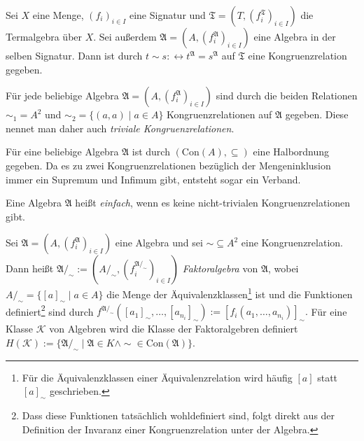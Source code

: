 \begin{example}
    Sei $X$ eine Menge, $(f_i)_{i\in I}$ eine Signatur und $\mathfrak{T}=(T,(f^\mathfrak{T}_i)_{i\in I})$ die Termalgebra über $X$.
    Sei außerdem $\mathfrak{A}=(A,(f^\mathfrak{A}_i)_{i\in I})$ eine Algebra in der selben Signatur. Dann ist durch
    $t\sim s:\leftrightarrow t^\mathfrak{A}=s^\mathfrak{A}$ auf $\mathfrak{T}$ eine Kongruenzrelation gegeben.
\end{example}

\begin{example}
    Für jede beliebige Algebra $\mathfrak{A}=(A,(f^\mathfrak{A}_i)_{i\in I})$ sind durch die beiden Relationen $\sim_1=A^2$ und $\sim_2=\{(a,a)\mid a\in A\}$
    Kongruenzrelationen auf $\mathfrak{A}$ gegeben. Diese nennet man daher auch \emph{triviale Kongruenzrelationen}.
\end{example}

\begin{remark}
    Für eine beliebige Algebra $\mathfrak{A}$ ist durch $(\text{Con}(A),\subseteq)$ eine Halbordnung gegeben.
    Da es zu zwei Kongruenzrelationen bezüglich der Mengeninklusion immer ein Supremum und Infimum gibt,
    entsteht sogar ein Verband.
\end{remark}

\begin{definition}
    Eine Algebra $\mathfrak{A}$ heißt \emph{einfach}, wenn es keine nicht-trivialen Kongruenzrelationen gibt.
\end{definition}

\begin{definition}
    Sei $\mathfrak{A}=(A,(f^\mathfrak{A}_i)_{i\in I})$ eine Algebra und sei $\sim\subseteq A^2$ eine Kongruenzrelation.
    Dann heißt $\mathfrak{A}/_\sim:=(A/_\sim,(f^{\mathfrak{A}/_\sim}_i)_{i\in I})$ \emph{Faktoralgebra} von $\mathfrak{A}$,
    wobei $A/_\sim=\{[a]_\sim\mid a\in A\}$ die Menge der Äquivalenzklassen\footnote{Für die Äquivalenzklassen einer Äquivalenzrelation
    wird häufig $[a]$ statt $[a]_\sim$ geschrieben.} ist und die Funktionen definiert\footnote{Dass diese Funktionen tatsächlich wohldefiniert sind,
    folgt direkt aus der Definition der Invaranz einer Kongruenzrelation unter der Algebra.} sind durch
    $f^{\mathfrak{A}/_\sim}([a_1]_\sim,\ldots,[a_{n_i}]_\sim):=[f_i(a_1,\ldots,a_{n_i})]_\sim.$
    Für eine Klasse $\mathcal{K}$ von Algebren wird die Klasse der Faktoralgebren definiert $H(\mathcal{K}):=\{\mathfrak{A}/_\sim\mid \mathfrak{A}\in K \land \sim\in\text{Con}(\mathfrak{A})\}$.
\end{definition}

